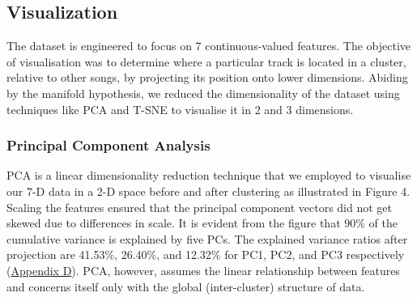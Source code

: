 \documentclass{article}
\begin{document}



\subsection{Visualization}
The dataset is engineered to focus on 7 continuous-valued features. The objective of visualisation was to determine where a particular track is located in a cluster, relative to other songs, by projecting its position onto lower dimensions. Abiding by the manifold hypothesis, we reduced the dimensionality of the dataset using techniques like PCA and T-SNE to visualise it in 2 and 3 dimensions.

\subsubsection{Principal Component Analysis}
PCA is a linear dimensionality reduction technique that we employed to visualise our 7-D data in a 2-D space before and after clustering as illustrated in Figure 4. Scaling the features ensured that the principal component vectors did not get skewed due to differences in scale. It is evident from the figure that 90\% of the cumulative variance is explained by five PCs. The explained variance ratios after projection are 41.53\%, 26.40\%, and 12.32\% for PC1, PC2, and PC3 respectively (\hyperref[app:expVariance]{Appendix D}). PCA, however, assumes the linear relationship between features and concerns itself only with the global (inter-cluster) structure of data.
\end{document}
